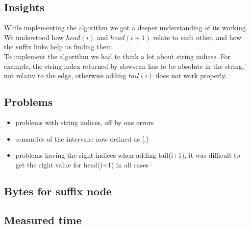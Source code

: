 \documentclass[a4paper,10pt]{article}
\author{Holger Schmeisky, Tashi Sherpa, Matúš Tomlein}
\date{30.04.2013}
\begin{document}
\subsection{Insights}
While implementing the algorithm we got a deeper understanding of its working. We understood how $head(i)$ and $head(i+1)$ relate to each other, and how the suffix links help us finding them.\\
To implement the algorithm we had to think a lot about string indices. For example, the string index returned by slowscan has to be absolute in the string, not relativ to the edge, otherwise adding $tail(i)$ does not work properly.

\subsection{Problems}
\begin{itemize}
  \item problems with string indices, off by one errors
  \item semantics of the intervals: now defined as [,)
  \item problems having the right indices when adding tail(i+1), it was difficult to get the right value for head(i+1) in all cases
\end{itemize}

\subsection{Bytes for suffix node}

\subsection{Measured time}
\end{document}
